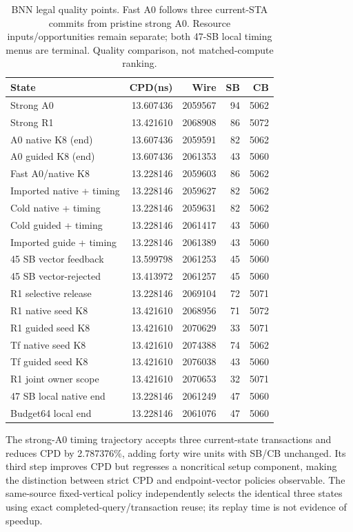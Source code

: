 \documentclass[conference,10pt]{IEEEtran}
\begin{document}
\begin{table}[t]
\centering\caption{BNN legal quality points. Fast A0 follows three current-STA commits from pristine strong A0. Resource inputs/opportunities remain separate; both 47-SB local timing menus are terminal. Quality comparison, not matched-compute ranking.}
\label{tab:bnn}
\small
\begin{tabular}{lrrrr}\hline
State & CPD(ns) & Wire & SB & CB\\\hline
Strong A0 &13.607436&2059567&94&5062\\
Strong R1 &13.421610&2068908&86&5072\\
A0 native K8 (end) &13.607436&2059591&82&5062\\
A0 guided K8 (end) &13.607436&2061353&43&5060\\
Fast A0/native K8 &13.228146&2059603&86&5062\\
Imported native + timing &13.228146&2059627&82&5062\\
Cold native + timing &13.228146&2059631&82&5062\\
Cold guided + timing &13.228146&2061417&43&5060\\
Imported guide + timing &13.228146&2061389&43&5060\\
45 SB vector feedback &13.599798&2061253&45&5060\\
45 SB vector-rejected &13.413972&2061257&45&5060\\
R1 selective release &13.228146&2069104&72&5071\\
R1 native seed K8 &13.421610&2068956&71&5072\\
R1 guided seed K8 &13.421610&2070629&33&5071\\
Tf native seed K8 &13.421610&2074388&74&5062\\
Tf guided seed K8 &13.421610&2076038&43&5060\\
R1 joint owner scope &13.421610&2070653&32&5071\\
47 SB local native end &13.228146&2061249&47&5060\\
Budget64 local end &13.228146&2061076&47&5060\\\hline
\end{tabular}
\end{table}
The strong-A0 timing trajectory accepts three current-state transactions and reduces CPD by 2.787376\%, adding forty wire units with SB/CB unchanged. Its third step improves CPD but regresses a noncritical setup component, making the distinction between strict CPD and endpoint-vector policies observable. The same-source fixed-vertical policy independently selects the identical three states using exact completed-query/transaction reuse; its replay time is not evidence of speedup.
\end{document}
